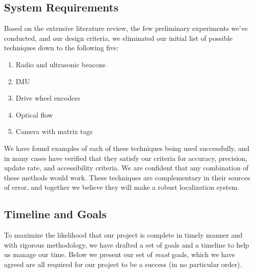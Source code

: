 \documentclass{article}
\begin{document}

  \subsection{System Requirements}\label{section:system_spec}

    Based on the extensive literature review, the few preliminary experiments we've conducted, and our design criteria, we eliminated our initial list of possible techniques down to the following five:

    \begin{enumerate}
        \item Radio and ultrasonic beacons
        \item IMU
        \item Drive wheel encoders
        \item Optical flow
        \item Camera with matrix tags
    \end{enumerate}

    We have found examples of each of these techniques being used successfully, and in many cases have verified that they satisfy our criteria for accuracy, precision, update rate, and accessibility criteria. We are confident that any combination of these methods would work. These techniques are complementary in their sources of error, and together we believe they will make a robust localization system.

  \subsection{Timeline and Goals}

    To maximize the likelihood that our project is complete in timely manner and with rigorous methodology, we have drafted a set of goals and a timeline to help us manage our time. Below we present our set of \textit{must} goals, which we have agreed are all required for our project to be a success (in no particular order).
\end{document}
